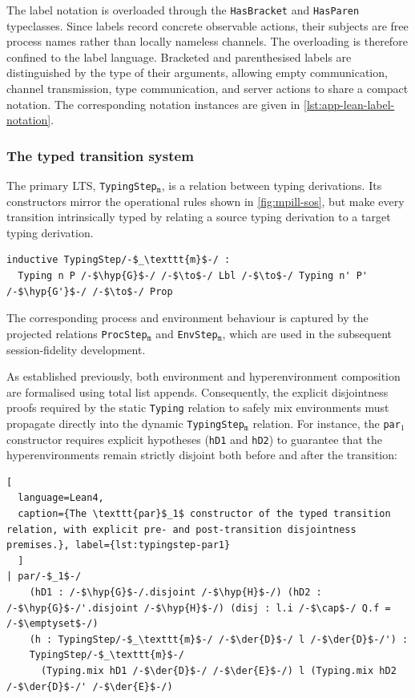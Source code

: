 The label notation is overloaded through the \texttt{HasBracket} and \texttt{HasParen} typeclasses. Since labels record concrete observable actions, their subjects are free process names rather than locally nameless channels. The overloading is therefore confined to the label language. Bracketed and parenthesised labels are distinguished by the type of their arguments, allowing empty communication, channel transmission, type communication, and server actions to share a compact notation. The corresponding notation instances are given in \cref{lst:app-lean-label-notation}.

\subsubsection{The typed transition system}\label{subsubsec:judgementstep}
The primary LTS, \texttt{TypingStep}$_{\texttt{m}}$, is a relation between typing derivations. Its constructors mirror the operational rules shown in \cref{fig:mpill-sos}, but make every transition intrinsically typed by relating a source typing derivation to a target typing derivation.

\begin{lstlisting}[language=Lean4]
inductive TypingStep/-$_\texttt{m}$-/ :
  Typing n P /-$\hyp{G}$-/ /-$\to$-/ Lbl /-$\to$-/ Typing n' P' /-$\hyp{G'}$-/ /-$\to$-/ Prop
\end{lstlisting}

The corresponding process and environment behaviour is captured by the projected relations \texttt{ProcStep}$_{\texttt{m}}$ and \texttt{EnvStep}$_{\texttt{m}}$, which are used in the subsequent session-fidelity development.

As established previously, both environment and hyperenvironment composition are formalised using total list appends. Consequently, the explicit disjointness proofs required by the static \texttt{Typing} relation to safely mix environments must propagate directly into the dynamic \texttt{TypingStep}$_\texttt{m}$ relation. For instance, the \texttt{par$_1$} constructor requires explicit hypotheses (\texttt{hD1} and \texttt{hD2}) to guarantee that the hyperenvironments remain strictly disjoint both before and after the transition:

\begin{lstlisting}[
  language=Lean4,
  caption={The \texttt{par}$_1$ constructor of the typed transition relation, with explicit pre- and post-transition disjointness premises.}, label={lst:typingstep-par1}
  ]
| par/-$_1$-/
    (hD1 : /-$\hyp{G}$-/.disjoint /-$\hyp{H}$-/) (hD2 : /-$\hyp{G}$-/'.disjoint /-$\hyp{H}$-/) (disj : l.i /-$\cap$-/ Q.f = /-$\emptyset$-/)
    (h : TypingStep/-$_\texttt{m}$-/ /-$\der{D}$-/ l /-$\der{D}$-/') :
    TypingStep/-$_\texttt{m}$-/
      (Typing.mix hD1 /-$\der{D}$-/ /-$\der{E}$-/) l (Typing.mix hD2 /-$\der{D}$-/' /-$\der{E}$-/)
\end{lstlisting}


